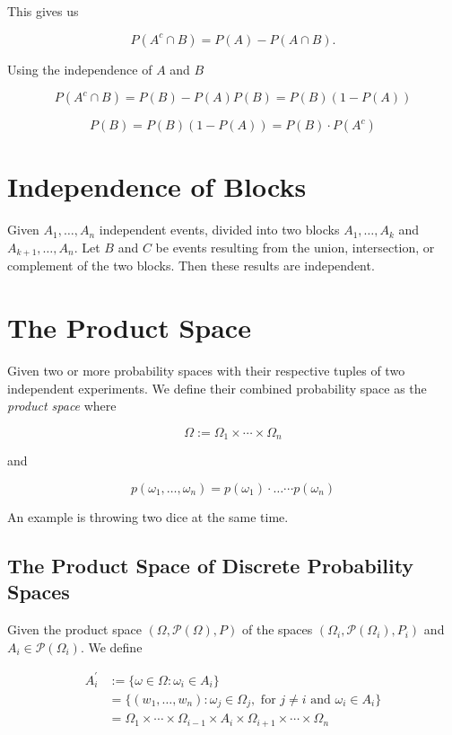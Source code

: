 This gives us 

\[
    P(A^c \cap B) = P(A) - P(A \cap B).
\]

Using the independence of \(A\) and \(B\)

\[
    P(A^c \cap B) = P(B) - P(A)P(B) = P(B) (1 - P(A))
\]

\[
    P(B) = P(B) (1 - P(A)) = P(B) \cdot P(A^c)
\]

\QED 

\section{Independence of Blocks} 

Given \(A_1, \dots, A_n\) independent events, divided into two blocks \(A_1, \dots, A_{k}\) and \(A_{k + 1}, \dots, A_n\). Let 
\(B\) and \(C\) be events resulting from the union, intersection, or complement of the two blocks. Then these results are 
independent.

\section{The Product Space}

Given two or more probability spaces with their respective tuples of two independent experiments. We define their 
combined probability space as the \emph{product space} where 

\[
    \Omega := \Omega_1 \times \cdots \times \Omega_n
\]

and

\[
    p(\omega_1, \dots, \omega_n) = p(\omega_1) \cdot \dots \cdots p(\omega_n)
\]

An example is throwing two dice at the same time.

\subsection{The Product Space of Discrete Probability Spaces}

Given the product space \((\Omega, \mathcal{P}(\Omega), P)\) of the spaces \((\Omega_i, \mathcal{P}(\Omega_i), P_i)\) and 
\(A_i \in \mathcal{P}(\Omega_i)\). We define 

\begin{align*}
    A_{i}^{'} &:= \{\omega \in \Omega : \omega_i \in A_i\} \\ 
	      &= \{(w_1, \dots, w_n) : \omega_j \in \Omega_j, \text{ for } j \neq i \text{ and }\omega_i \in A_i\} \\
	      &= \Omega_1 \times \cdots \times \Omega_{i - 1} \times A_i \times \Omega_{i + 1} \times \cdots \times \Omega_n
\end{align*}

